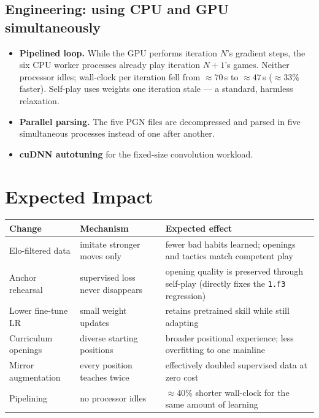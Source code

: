 \documentclass[11pt,a4paper]{article}
\begin{document}
\subsection{Engineering: using CPU and GPU simultaneously}
\begin{itemize}
  \item \textbf{Pipelined loop.} While the GPU performs iteration $N$'s
        gradient steps, the six CPU worker processes already play iteration
        $N{+}1$'s games. Neither processor idles; wall-clock per iteration
        fell from $\approx 70$\,s to $\approx 47$\,s ($\approx 33$\% faster).
        Self-play uses weights one iteration stale --- a standard, harmless
        relaxation.
  \item \textbf{Parallel parsing.} The five PGN files are decompressed and
        parsed in five simultaneous processes instead of one after another.
  \item \textbf{cuDNN autotuning} for the fixed-size convolution workload.
\end{itemize}

\section{Expected Impact}

\begin{center}
\begin{tabular}{p{5.6cm}p{4.1cm}p{4.6cm}}
\toprule
Change & Mechanism & Expected effect \\
\midrule
Elo-filtered data & imitate stronger moves only & fewer bad habits learned;
openings and tactics match competent play \\
Anchor rehearsal & supervised loss never disappears & opening quality is
preserved through self-play (directly fixes the \texttt{1.f3} regression) \\
Lower fine-tune LR & small weight updates & retains pretrained skill while
still adapting \\
Curriculum openings & diverse starting positions & broader positional
experience; less overfitting to one mainline \\
Mirror augmentation & every position teaches twice & effectively doubled
supervised data at zero cost \\
Pipelining & no processor idles & $\approx$40\% shorter wall-clock for the
same amount of learning \\
\bottomrule
\end{tabular}
\end{center}
\end{document}
